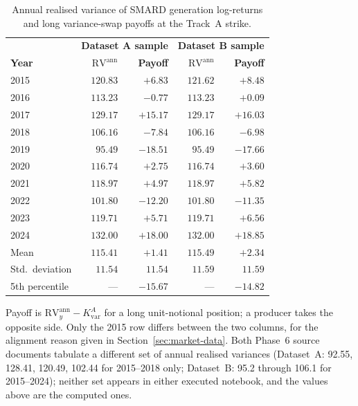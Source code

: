 \documentclass[11pt, a4paper, twoside]{article}
\begin{document}
\begin{table}[htbp]
\centering
\caption{Annual realised variance of SMARD generation log-returns and long variance-swap payoffs at the Track~A strike.}
\label{tab:payoff}
\begin{tabular}{l r r r r}
\toprule
& \multicolumn{2}{c}{\textbf{Dataset A sample}} & \multicolumn{2}{c}{\textbf{Dataset B sample}} \\
\textbf{Year} & \textbf{$\mathrm{RV}^{\text{ann}}$} & \textbf{Payoff} & \textbf{$\mathrm{RV}^{\text{ann}}$} & \textbf{Payoff} \\
\midrule
2015 & $120.83$ & $+6.83$ & $121.62$ & $+8.48$ \\
2016 & $113.23$ & $-0.77$ & $113.23$ & $+0.09$ \\
2017 & $129.17$ & $+15.17$ & $129.17$ & $+16.03$ \\
2018 & $106.16$ & $-7.84$ & $106.16$ & $-6.98$ \\
2019 & $95.49$ & $-18.51$ & $95.49$ & $-17.66$ \\
2020 & $116.74$ & $+2.75$ & $116.74$ & $+3.60$ \\
2021 & $118.97$ & $+4.97$ & $118.97$ & $+5.82$ \\
2022 & $101.80$ & $-12.20$ & $101.80$ & $-11.35$ \\
2023 & $119.71$ & $+5.71$ & $119.71$ & $+6.56$ \\
2024 & $132.00$ & $+18.00$ & $132.00$ & $+18.85$ \\
\midrule
Mean & $115.41$ & $+1.41$ & $115.49$ & $+2.34$ \\
Std.\ deviation & $11.54$ & $11.54$ & $11.59$ & $11.59$ \\
5th percentile & --- & $-15.67$ & --- & $-14.82$ \\
\bottomrule
\end{tabular}
\par\vspace{4pt}
\begin{minipage}{0.92\textwidth}
\footnotesize Payoff is $\mathrm{RV}^{\text{ann}}_y - K_{\text{var}}^A$ for a long unit-notional position; a producer takes the opposite side. Only the 2015 row differs between the two columns, for the alignment reason given in Section~\ref{sec:market-data}. Both Phase~6 source documents tabulate a different set of annual realised variances (Dataset~A: 92.55, 128.41, 120.49, 102.44 for 2015--2018 only; Dataset~B: 95.2 through 106.1 for 2015--2024); neither set appears in either executed notebook, and the values above are the computed ones.
\end{minipage}
\end{table}
\end{document}

